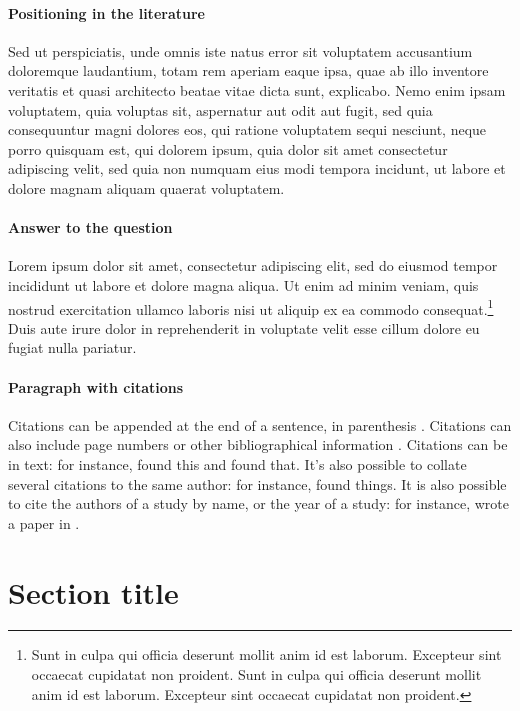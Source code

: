 \documentclass[letterpaper,12pt,leqno]{article}
\begin{document}
\paragraph{Positioning in the literature} Sed ut perspiciatis, unde omnis iste natus error sit voluptatem accusantium doloremque laudantium, totam rem aperiam eaque ipsa, quae ab illo inventore veritatis et quasi architecto beatae vitae dicta sunt, explicabo. Nemo enim ipsam voluptatem, quia voluptas sit, aspernatur aut odit aut fugit, sed quia consequuntur magni dolores eos, qui ratione voluptatem sequi nesciunt, neque porro quisquam est, qui dolorem ipsum, quia dolor sit amet consectetur adipiscing velit, sed quia non numquam eius modi tempora incidunt, ut labore et dolore magnam aliquam quaerat voluptatem.

\paragraph{Answer to the question} Lorem ipsum dolor sit amet, consectetur adipiscing elit, sed do eiusmod tempor incididunt ut labore et dolore magna aliqua. Ut enim ad minim veniam, quis nostrud exercitation ullamco laboris nisi ut aliquip ex ea commodo consequat.\footnote{Sunt in culpa qui officia deserunt mollit anim id est laborum. Excepteur sint occaecat cupidatat non proident. Sunt in culpa qui officia deserunt mollit anim id est laborum. Excepteur sint occaecat cupidatat non proident.} Duis aute irure dolor in reprehenderit in voluptate velit esse cillum dolore eu fugiat nulla pariatur. 

\paragraph{Paragraph with citations} Citations can be appended at the end of a sentence, in parenthesis \citep{LMS18a}. Citations can also include page numbers or other bibliographical information \citep[p. 1305]{MS19}. Citations can be in text: for instance, \citet{M12} found this and \citet{M14} found that. It's also possible to collate several citations to the same author: for instance, \citet{M12,M14} found things. It is also possible to cite the authors of a study by name, or the year of a study: for instance, \citeauthor{EMM21} wrote a paper in \citeyear{EMM21}.

\section{Section title}\label{s:section}
\end{document}
